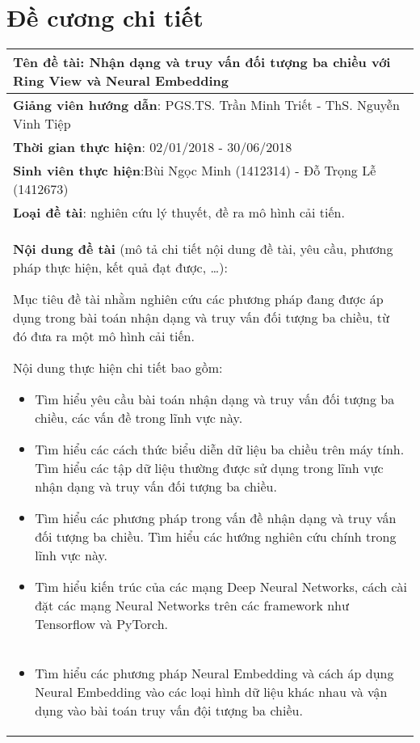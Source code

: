 \chapter{Đề cương chi tiết}
\begin{longtable}{|l|c|}
\hline
\multicolumn{2}{|m{\linewidth}|}{\textbf{Tên đề tài}: Nhận dạng và truy vấn đối tượng ba chiều với Ring View và Neural Embedding
}\\
\hline
\multicolumn{2}{|m{\linewidth}|}{\textbf{Giảng viên hướng dẫn}: PGS.TS. Trần Minh Triết - ThS. Nguyễn Vinh Tiệp} \\
\hline
\multicolumn{2}{|m{\linewidth}|}{\textbf{Thời gian thực hiện}: 02/01/2018 - 30/06/2018}\\
\hline
\multicolumn{2}{|m{\linewidth}|}{\textbf{Sinh viên thực hiện}:Bùi Ngọc Minh (1412314) - Đỗ Trọng Lễ (1412673)}\\
\hline
\multicolumn{2}{|m{\linewidth}|}{\textbf{Loại đề tài}: nghiên cứu lý thuyết, đề ra mô hình cải tiến.}\\
\hline
\multicolumn{2}{|m{\linewidth}|}{\textbf{Nội dung đề tài} (mô tả chi tiết nội dung đề tài, yêu cầu, phương pháp thực hiện, kết quả đạt được, …):\par
Mục tiêu đề tài nhằm nghiên cứu các phương pháp đang được áp dụng trong bài toán nhận dạng và truy vấn đối tượng ba chiều, từ đó đưa ra một mô hình cải tiến.\par
Nội dung thực hiện chi tiết bao gồm:
\begin{itemize}
\item Tìm hiểu yêu cầu bài toán nhận dạng và truy vấn đối tượng ba chiều, các vấn đề trong lĩnh vực này.
\item Tìm hiểu các cách thức biểu diễn dữ liệu ba chiều trên máy tính. Tìm hiểu các tập dữ liệu thường được sử dụng trong lĩnh vực nhận dạng và truy vấn đối tượng ba chiều.
\item Tìm hiểu các phương pháp trong vấn đề nhận dạng và truy vấn đối tượng ba chiều. Tìm hiểu các hướng nghiên cứu chính trong lĩnh vực này.

\item Tìm hiểu kiến trúc của các mạng Deep Neural Networks, cách cài đặt các mạng Neural Networks trên các framework như Tensorflow và PyTorch.

\end{itemize}}\\
\hline
\multicolumn{2}{|m{\linewidth}|}{\begin{itemize}

\item Tìm hiểu các phương pháp Neural Embedding và cách áp dụng Neural Embedding vào các loại hình dữ liệu khác nhau và vận dụng vào bài toán truy vấn đội tượng ba chiều.


\end{itemize}}
\end{longtable}

